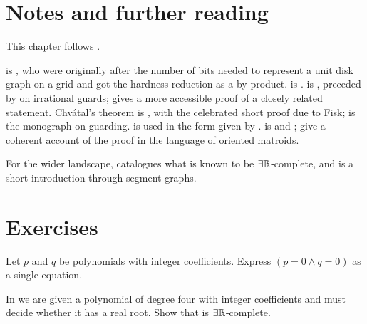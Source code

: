\section{Notes and further reading}
\label{sec:geometric-er-further-reading}

This chapter follows \citet{Miltzow2026}.

 is \citet{McDiarmidMuller2013}, who were originally after the
number of bits needed to represent a unit disk graph on a grid and got the
hardness reduction as a by-product.  is
\citet{Erickson2019}.  is
\citet{AbrahamsenAdamaszekMiltzow2022}, preceded by
\citet{AbrahamsenAdamaszekMiltzow2017} on irrational guards;
\citet{Stade2025} gives a more accessible proof of a closely related statement.
Chv\'atal's theorem is \citet{Chvatal1975}, with the celebrated short proof due
to Fisk; \citet{ORourke1987} is the monograph on guarding.
 is used in the form given by
\citet{SchaeferStefankovic2017}.  is \citet{Mnev1985}
and \citet{Shor1991}; \citet{BokowskiMockStreinu2001} give a coherent account of
the proof in the language of oriented matroids.

For the wider landscape, \citet{SchaeferCardinalMiltzow2024} catalogues what is
known to be $\exists\mathbb{R}$-complete, and \citet{Matousek2014} is a short introduction
through segment graphs.
\section{Exercises}
\label{sec:ex-geometric-er}

\begin{exercise}
Let $p$ and $q$ be polynomials with integer coefficients. Express
$(p = 0 \wedge q = 0)$ as a single equation.
\end{exercise}

\begin{exercise}
In  we are given a polynomial of degree four with integer
coefficients and must decide whether it has a real root. Show that
 is $\exists\mathbb{R}$-complete.
\end{exercise}

